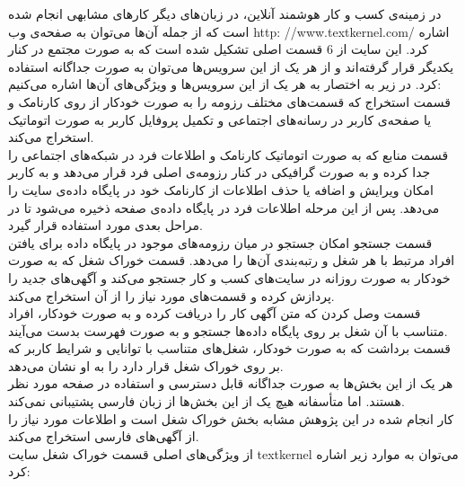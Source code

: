 
در زمینه‌ی کسب و کار هوشمند آنلاین، در زبان‌های دیگر کارهای مشابهی انجام شده است که از جمله آن‌ها می‌توان به صفحه‌ی وب http: //www.textkernel.com/ اشاره کرد. این سایت از 6 قسمت اصلی تشکیل شده است که به صورت مجتمع در کنار یکدیگر قرار گرفته‌اند و از هر یک از این سرویس‌ها می‌توان به صورت جداگانه استفاده کرد. در زیر به اختصار به هر یک از این سرویس‌ها و ویژگی‌های آن‌ها اشاره می‌کنیم:
\\
قسمت استخراج که قسمت‌های مختلف رزومه را به صورت خودکار از روی کارنامک و یا صفحه‌ی کاربر در رسانه‌های اجتماعی و تکمیل پروفایل کاربر به صورت اتوماتیک استخراج می‌کند.
\\
قسمت منابع که به صورت اتوماتیک کارنامک و اطلاعات فرد در شبکه‌های اجتماعی را جدا کرده و به صورت گرافیکی در کنار رزومه‌ی اصلی فرد قرار می‌دهد و به کاربر امکان ویرایش و اضافه یا حذف اطلاعات از کارنامک خود در پایگاه داده‌ی سایت را می‌دهد. پس از این مرحله اطلاعات فرد در پایگاه داده‌ی صفحه ذخیره می‌شود تا در مراحل بعدی مورد استفاده قرار گیرد.
\\
قسمت جستجو امکان جستجو در میان رزومه‌های موجود در پایگاه داده برای یافتن افراد مرتبط با هر شغل و رتبه‌بندی آن‌ها را می‌دهد.
قسمت خوراک شغل که به صورت خودکار به صورت روزانه در سایت‌های کسب و کار جستجو می‌کند و آگهی‌های جدید را پردازش کرده و قسمت‌های مورد نیاز را از آن استخراج می‌کند.
\\
قسمت وصل کردن که متن آگهی کار را دریافت کرده و به صورت خودکار، افراد متناسب با آن شغل بر روی پایگاه داده‌ها جستجو و به صورت فهرست بدست می‌آیند.
\\
قسمت برداشت که به صورت خودکار، شغل‌های متناسب با توانایی و شرایط کاربر که بر روی خوراک شغل قرار دارد را به او نشان می‌دهد.
\\
هر یک از این بخش‌ها به صورت جداگانه قابل دسترسی و استفاده در صفحه مورد نظر هستند. اما متأسفانه هیچ یک از این بخش‌ها از زبان فارسی پشتیبانی نمی‌کند.
\\
کار انجام شده در این پژوهش مشابه بخش خوراک شغل است و اطلاعات مورد نیاز را از آگهی‌های فارسی استخراج می‌کند.
\\
از ویژگی‌های اصلی قسمت خوراک شغل سایت textkernel می‌توان به موارد زیر اشاره کرد:


